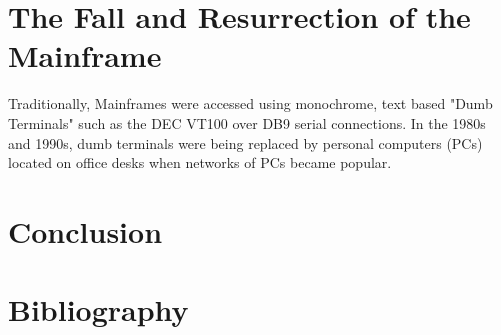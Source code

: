 \documentclass[a4paper,12pt]{article}
\begin{document}
\section{The Fall and Resurrection of the Mainframe}

Traditionally, Mainframes were accessed using monochrome, text 
based "Dumb Terminals" such as the DEC VT100 over DB9 serial 
connections. In the 1980s and 1990s, dumb terminals were being replaced
by personal computers (PCs) located on office desks when networks of PCs
became popular.


\cite[In the late 1990s, corporations found new uses for their
mainframes, since they can offer web server performance similar to that 
of hundreds of smaller machines, but with much lower power and 
administration costs. The growth of e-business has also dramatically 
increased the number of backend transactions processed by 
tried-and-true mainframe software as well as the size and 
throughput of databases. In late 2004, IBM's mainframe revenues were
increasing even with price reductions, thanks to attractive TCOs.]{m1}

\section{Conclusion}

\section{Bibliography}


\end{document}
